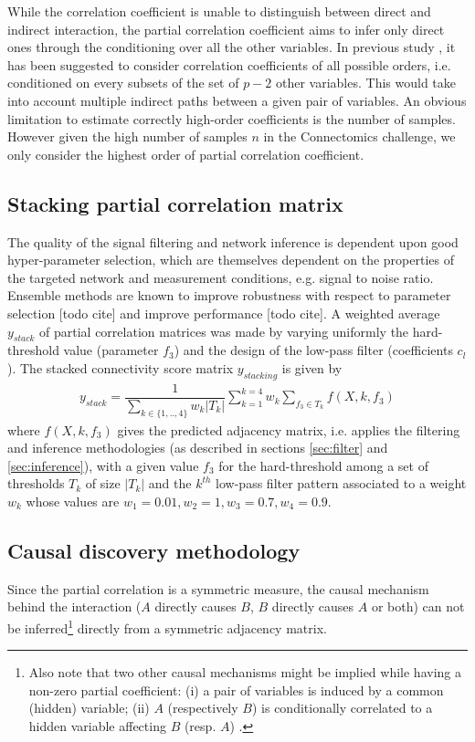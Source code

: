 \documentclass[wcp]{jmlr}
\begin{document}
While the correlation coefficient is unable to distinguish between
direct and indirect interaction, the partial correlation coefficient
aims to infer only direct ones through the conditioning over all the other
variables. In previous study \cite{shipley2002cause}, it has been suggested to
consider correlation coefficients of all possible orders,
i.e. conditioned on every subsets of the set of $p-2$ other variables. This
would take into account multiple indirect paths between a given pair of
variables. An obvious limitation to estimate correctly high-order coefficients
is the number of samples. However given the high number of samples $n$
in the Connectomics challenge, we only consider the highest order of partial
correlation coefficient.


\subsection{Stacking partial correlation matrix}
\label{sec:stacking}

The quality of the signal filtering and network inference is dependent upon
good hyper-parameter selection, which are themselves dependent on the properties
of the targeted network and measurement conditions, e.g. signal to noise ratio.
Ensemble methods are known to improve robustness with respect to parameter
selection [todo cite] and improve performance [todo cite].
A weighted average $y_{stack}$ of partial correlation matrices was made
by varying uniformly the hard-threshold value (parameter $f_3$) and the design
of the low-pass filter (coefficients $c_l$). The stacked connectivity score
matrix $y_{stacking}$ is given by
\begin{align}
y_{stack} =  \dfrac{1}{\sum_{k\in\{1,..,4\}} w_k |T_k|} \sum_{k=1}^{k=4}  w_k \sum_{f_3 \in T_k} f(X, k, f_3)
\end{align}
where $f(X, k, f_3)$ gives the predicted adjacency matrix, i.e. applies the
filtering and inference methodologies (as described
in sections \ref{sec:filter} and \ref{sec:inference}), with a  given value
$f_3$ for the hard-threshold among a set of thresholds $T_k$ of size $|T_k|$
and the $k^{th}$ low-pass filter pattern associated to a weight $w_k$ whose
values are $w_1 = 0.01 , w_2 =1, w_3 = 0.7, w_4 = 0.9$.

\subsection{Causal discovery methodology}
Since the partial correlation is a symmetric measure, the causal mechanism behind the
interaction ($A$ directly causes $B$, $B$ directly causes $A$ or both) can not
be inferred\footnote{Also note that two other causal mechanisms might be
implied while having a non-zero partial coefficient: (i) a pair of variables
is induced by a common (hidden) variable; (ii) $A$ (respectively $B$) is
conditionally correlated to a hidden variable affecting $B$ (resp. $A$)
\cite{de2004discovery}.} directly from a symmetric adjacency matrix.
\end{document}

